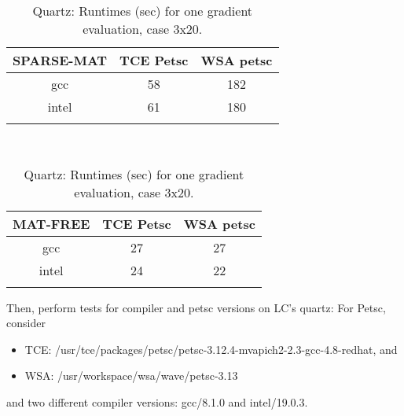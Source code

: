 \documentclass[letterpaper]{article}
\begin{document}
\begin{table}[h]
  \begin{tabular}{c|cc}
    \hline\noalign{\smallskip} 
   SPARSE-MAT &  TCE Petsc & WSA petsc    \\ 
    \hline\noalign{\smallskip} 
      gcc  &   58       &     182        \\
      intel&   61       &     180 \\
      \noalign{\smallskip}\hline
  \end{tabular}\\[2ex]
  \begin{tabular}{c|cc}
    \hline\noalign{\smallskip}
    MAT-FREE &  TCE Petsc & WSA petsc    \\ 
    \hline\noalign{\smallskip} 
      gcc  &   27       &     27         \\
      intel&   24       &     22 \\
    \noalign{\smallskip}\hline
  \end{tabular}
  \caption{Quartz: Runtimes (sec) for one gradient evaluation, case 3x20.}
  \label{tab:compiler_quartz} 
\end{table}

Then, perform tests for compiler and petsc versions on LC's quartz: For Petsc, consider
\begin{itemize}
  \item TCE: /usr/tce/packages/petsc/petsc-3.12.4-mvapich2-2.3-gcc-4.8-redhat, and
  \item WSA: /usr/workspace/wsa/wave/petsc-3.13
\end{itemize}
and two different compiler versions: gcc/8.1.0 and intel/19.0.3.
\end{document}

